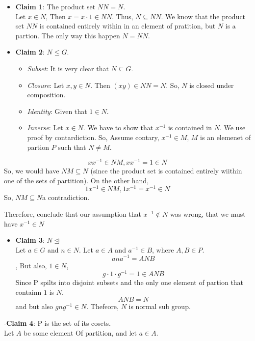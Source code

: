 \documentclass[
]{book}
\providecommand{\tightlist}{%
  \setlength{\itemsep}{0pt}\setlength{\parskip}{0pt}}
\begin{document}
\begin{itemize}
\item
  \textbf{Claim 1}: The product set \(NN=N\).\\
  Let \(x\in N\), Then \(x=x\cdot 1 \in NN\). Thus, \(N \subseteq NN\).
  We know that the product set \(NN\) is contained entirely within in an
  element of pratition, but \(N\) is a partion. The only way this happen
  \(N=NN\).
\item
  \textbf{Claim 2}: \(N \leq G\).\\

  \begin{itemize}
  \tightlist
  \item
    \emph{Subset}: It is very clear that \(N \subseteq G\).
  \item
    \emph{Closure}: Let \(x,y\in N\). Then \((xy)\in NN=N\). So, \(N\)
    is closed under composition.
  \item
    \emph{Identity}: Given that \(1\in N\).
  \item
    \emph{Inverse}: Let \(x\in N\). We have to show that \(x^{-1}\) is
    contained in \(N\). We use proof by contardiction. So, Assume
    contary, \(x^{-1}\in M\), \(M\) is an elemenet of partion \(P\) such
    that \(N\neq M\).
  \end{itemize}
\end{itemize}

\[xx^{-1}\in NM, xx^{-1}=1 \in  N\] So, we would have \(NM \subseteq N\)
(since the product set is contained entirely wiithin one of the sets of
partition). On the other hand, \[1x^{-1}\in NM, 1x^{-1}=x^{-1} \in N\]
So, \(NM\subseteq N\)a contradiction.

Therefore, conclude that our assumption that \(x^{-1}\not\in N\) was
wrong, that we must have \(x^{-1}\in N\)

\begin{itemize}
\tightlist
\item
  \textbf{Claim 3}: \(N\trianglelefteq\)\\
  Let \(a\in G\) and \(n\in N\). Let \(a\in A\) and \(a^{-1}\in B\),
  where \(A,B\in P\). \[ana^{-1}=ANB\], But also, \(1\in N\),
  \[g\cdot 1 \cdot g ^{-1}=1\in ANB\] Since P spilts into disjoint
  subsets and the only one element of partion that containn \(1\) is
  \(N\). \[ANB=N\] and but also \(gng^{-1}\in N\). Thefeore, \(N\) is
  normal sub group.
\end{itemize}

-\textbf{Claim 4}: P is the set of its cosets.\\
Let \(A\) be some element Of partition, and let \(a \in A\).
\end{document}
